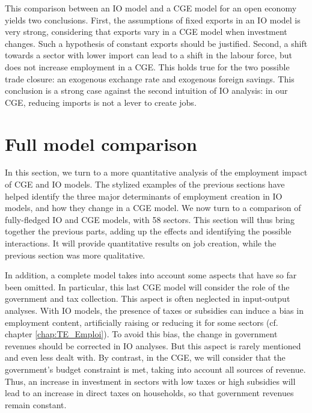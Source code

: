 This comparison between an IO model and a CGE model for an open economy yields two conclusions. 
First, the assumptions of fixed exports in an IO model is very strong, considering that exports vary in a CGE model when investment changes. Such a hypothesis of constant exports should be justified. 
Second, a shift towards a sector with lower import can lead to a shift in the labour force, but does not increase employment in a CGE. This holds true for the two possible trade closure: an exogenous exchange rate and exogenous foreign savings.
This conclusion is a strong case against the second intuition of IO analysis: in our CGE, reducing imports is not a lever to create jobs. 





\section{Full model comparison} \label{sec:fullModel}

In this section, we turn to a more quantitative analysis of the employment impact of CGE and IO models.
The stylized examples of the previous sections have helped identify the three major determinants of employment creation in IO models, and how they change in a CGE model.
We now turn to a comparison of fully-fledged IO and CGE models, with 58 sectors.
This section will thus bring together the previous parts, adding up the effects and identifying the possible interactions. It will provide quantitative results on job creation, while the previous section was more qualitative. 

In addition, a complete model takes into account some aspects that have so far been omitted. In particular, this last CGE model will consider the role of the government and tax collection. This aspect is often neglected in input-output analyses. With IO models, the presence of taxes or subsidies can induce a bias in employment content, artificially raising or reducing it for some sectors (cf. chapter \ref{chap:TE_Emploi}).
To avoid this bias, the change in government revenues should be corrected in IO analyses. But this aspect is rarely mentioned and even less dealt with.
By contrast, in the CGE, we will consider that the government's budget constraint is met, taking into account all sources of revenue. 
Thus, an increase in investment in sectors with low taxes or high subsidies will lead to an increase in direct taxes on households, so that government revenues remain constant.


